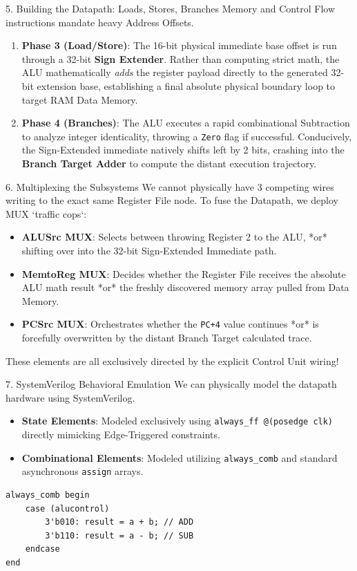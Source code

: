 \documentclass[aspectratio=169]{beamer}
\begin{document}
\begin{frame}{5. Building the Datapath: Loads, Stores, Branches}
Memory and Control Flow instructions mandate heavy Address Offsets.
\vspace{0.2cm}
\begin{enumerate}
    \item \textbf{Phase 3 (Load/Store)}: The 16-bit physical immediate base offset is run through a 32-bit \textbf{Sign Extender}. Rather than computing strict math, the ALU mathematically \textit{adds} the register payload directly to the generated 32-bit extension base, establishing a final absolute physical boundary loop to target RAM Data Memory.
    \item \textbf{Phase 4 (Branches)}: The ALU executes a rapid combinational Subtraction to analyze integer identicality, throwing a \texttt{Zero} flag if successful. Conducively, the Sign-Extended immediate natively shifts left by 2 bits, crashing into the \textbf{Branch Target Adder} to compute the distant execution trajectory.
\end{enumerate}
\end{frame}

\begin{frame}{6. Multiplexing the Subsystems}
We cannot physically have 3 competing wires writing to the exact same Register File node. To fuse the Datapath, we deploy MUX `traffic cops`:
\vspace{0.2cm}
\begin{itemize}
    \item \textbf{ALUSrc MUX}: Selects between throwing Register 2 to the ALU, *or* shifting over into the 32-bit Sign-Extended Immediate path.
    \item \textbf{MemtoReg MUX}: Decides whether the Register File receives the absolute ALU math result *or* the freshly discovered memory array pulled from Data Memory.
    \item \textbf{PCSrc MUX}: Orchestrates whether the \texttt{PC+4} value continues *or* is forcefully overwritten by the distant Branch Target calculated trace.
\end{itemize}
These elements are all exclusively directed by the explicit Control Unit wiring!
\end{frame}

\begin{frame}[fragile]{7. SystemVerilog Behavioral Emulation}
We can physically model the datapath hardware using SystemVerilog.
\vspace{0.2cm}
\begin{itemize}
    \item \textbf{State Elements}: Modeled exclusively using \texttt{always\_ff @(posedge clk)} directly mimicking Edge-Triggered constraints.
    \item \textbf{Combinational Elements}: Modeled utilizing \texttt{always\_comb} and standard asynchronous \texttt{assign} arrays.
\end{itemize}
\begin{verbatim}
always_comb begin
    case (alucontrol)
        3'b010: result = a + b; // ADD
        3'b110: result = a - b; // SUB
    endcase
end
\end{verbatim}
\end{frame}
\end{document}

